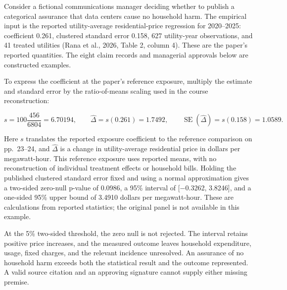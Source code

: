 \noindent \noindent Consider a fictional communications manager deciding whether
to publish a categorical assurance that data centers cause no household
harm. The empirical input is the reported utility-average
residential-price regression for 2020--2025: coefficient 0.261,
clustered standard error 0.158, 627 utility-year observations, and 41
treated utilities (Rana et al., 2026, Table 2, column 4). These are the
paper's reported quantities. The eight claim records and managerial
approvals below are constructed examples.

To express the coefficient at the paper's reference exposure, multiply
the estimate and standard error by the ratio-of-means scaling used in
the course reconstruction:

\[
s=100\frac{456}{6804}=6.70194,\qquad
\widehat{\Delta}=s(0.261)=1.7492,\qquad
\operatorname{SE}(\widehat{\Delta})=s(0.158)=1.0589.
\]

Here \(s\) translates the reported exposure coefficient to the reference
comparison on pp.~23--24, and \(\widehat{\Delta}\) is a change in
utility-average residential price in dollars per megawatt-hour. This
reference exposure uses reported means, with no reconstruction of
individual treatment effects or household bills. Holding the published
clustered standard error fixed and using a normal approximation gives a
two-sided zero-null p-value of 0.0986, a 95\% interval of {[}−0.3262,
3.8246{]}, and a one-sided 95\% upper bound of 3.4910 dollars per
megawatt-hour. These are calculations from reported statistics; the
original panel is not available in this example.

At the 5\% two-sided threshold, the zero null is not rejected. The
interval retains positive price increases, and the measured outcome
leaves household expenditure, usage, fixed charges, and the relevant
incidence unresolved. An assurance of no household harm exceeds both the
statistical result and the outcome represented. A valid source citation
and an approving signature cannot supply either missing premise.

